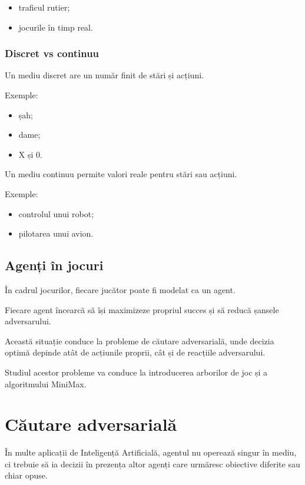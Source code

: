 \documentclass[12pt,a4paper]{article}
\begin{document}
\begin{itemize}
\item traficul rutier;
\item jocurile în timp real.
\end{itemize}

\subsubsection{Discret vs continuu}

Un mediu discret are un număr finit de stări și acțiuni.

Exemple:

\begin{itemize}
\item șah;
\item dame;
\item X și 0.
\end{itemize}

Un mediu continuu permite valori reale pentru stări sau acțiuni.

Exemple:

\begin{itemize}
\item controlul unui robot;
\item pilotarea unui avion.
\end{itemize}

\subsection{Agenți în jocuri}

În cadrul jocurilor, fiecare jucător poate fi modelat ca un agent.

Fiecare agent încearcă să își maximizeze propriul succes și să reducă șansele adversarului.

Această situație conduce la probleme de căutare adversarială, unde decizia optimă depinde atât de acțiunile proprii, cât și de reacțiile adversarului.

Studiul acestor probleme va conduce la introducerea arborilor de joc și a algoritmului MiniMax.








\section{Căutare adversarială}

În multe aplicații de Inteligență Artificială, agentul nu operează singur în mediu, ci trebuie să ia decizii în prezența altor agenți care urmăresc obiective diferite sau chiar opuse.
\end{document}
